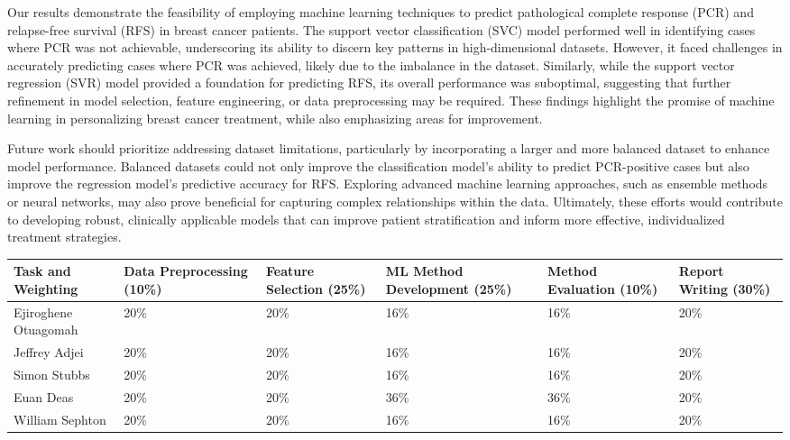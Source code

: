 \documentclass{article}
\begin{document}
Our results demonstrate the feasibility of employing machine learning techniques to predict pathological complete response (PCR) and relapse-free survival (RFS) in breast cancer patients. The support vector classification (SVC) model performed well in identifying cases where PCR was not achievable, underscoring its ability to discern key patterns in high-dimensional datasets. However, it faced challenges in accurately predicting cases where PCR was achieved, likely due to the imbalance in the dataset. Similarly, while the support vector regression (SVR) model provided a foundation for predicting RFS, its overall performance was suboptimal, suggesting that further refinement in model selection, feature engineering, or data preprocessing may be required. These findings highlight the promise of machine learning in personalizing breast cancer treatment, while also emphasizing areas for improvement.

Future work should prioritize addressing dataset limitations, particularly by incorporating a larger and more balanced dataset to enhance model performance. Balanced datasets could not only improve the classification model's ability to predict PCR-positive cases but also improve the regression model's predictive accuracy for RFS. Exploring advanced machine learning approaches, such as ensemble methods or neural networks, may also prove beneficial for capturing complex relationships within the data. Ultimately, these efforts would contribute to developing robust, clinically applicable models that can improve patient stratification and inform more effective, individualized treatment strategies.




\begin{table}[bp]
  \begin{tabular}{|p{2cm}|p{2.5cm}|p{2.5cm}|p{2.5cm}|p{2.5cm}|p{2.5cm}|}
  \hline
  \textbf{Task and Weighting} & \textbf{Data Preprocessing (10\%)} & \textbf{Feature Selection (25\%)} & \textbf{ML Method Development (25\%)} & \textbf{Method Evaluation (10\%)} & \textbf{Report Writing (30\%)} \\ \hline
  Ejiroghene Otuagomah & 20\% & 20\% & 16\% & 16\% & 20\% \\ \hline
  Jeffrey Adjei & 20\% & 20\% & 16\% & 16\% & 20\% \\ \hline
  Simon Stubbs & 20\% & 20\% & 16\% & 16\% & 20\% \\ \hline
  Euan Deas & 20\% & 20\% & 36\% & 36\% & 20\% \\ \hline
  William Sephton & 20\% & 20\% & 16\% & 16\% & 20\% \\ \hline
  \end{tabular}
  \end{table}
\end{document}
